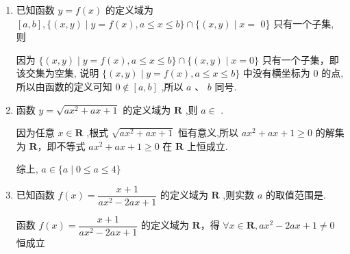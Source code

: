 \begin{enumerate}
\begin{jieda}
        则函数 $y = \dfrac{f\left( {{2x} - 1}\right) }{x - 1}$ 的定义域为 $\left\lbrack  {-\dfrac{1}{2},1}\right)  \cup  (1,3\rbrack$ .
    \end{jieda}
    \item 已知函数 $y = f\left( x\right)$ 的定义域为 $\left\lbrack  {a,b}\right\rbrack  ,\{ \left( {x,y}\right)  \mid  y = f\left( x\right) ,a \leq  x \leq  b\}  \cap  \{ \left( {x,y}\right)  \mid  x =$ 0\} 只有一个子集, 则
    \begin{jieda}
        因为 $\{ \left( {x,y}\right)  \mid  y = f\left( x\right) ,a \leq  x \leq  b\}  \cap  \{ \left( {x,y}\right)  \mid  x = 0\}$ 只有一个子集，即该交集为空集, 说明 $\{ \left( {x,y}\right)  \mid  y = f\left( x\right) ,a \leq  x \leq  b\}$ 中没有横坐标为 0 的点,所以由函数的定义可知 $0 \notin  \left\lbrack  {a,b}\right\rbrack$ ,所以 $a\text{ 、 }b$ 同号.
    \end{jieda}
    \item 函数 $y = \sqrt{a{x}^{2} + {ax} + 1}$ 的定义域为 $\mathbf{R}$ ,则 $a \in$ .
    \begin{jieda}
        因为任意 $x \in  \mathbf{R}$ ,根式 $\sqrt{a{x}^{2} + {ax} + 1}$ 恒有意义,所以 $a{x}^{2} + {ax} + 1 \geq  0$ 的解集为 $\mathbf{R}$，即不等式 $a{x}^{2} + {ax} + 1 \geq  0$ 在 $\mathbf{R}$ 上恒成立.

        综上, $a \in  \{ a \mid  0 \leq  a \leq  4\}$
    \end{jieda}
    \item 已知函数 $f\left( x\right)  = \dfrac{x + 1}{a{x}^{2} - {2ax} + 1}$ 的定义域为 $\mathbf{R}$ ,则实数 $a$ 的取值范围是.
    \begin{jieda}
        函数 $f\left( x\right)  = \dfrac{x + 1}{a{x}^{2} - {2ax} + 1}$ 的定义域为 $\mathbf{R}$，得 $\forall x \in  \mathbf{R},a{x}^{2} - {2ax} + 1 \neq  0$ 恒成立
        

\end{jieda}
\end{enumerate}
